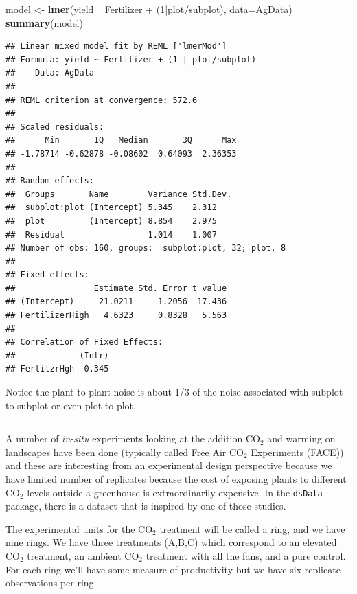 \documentclass[]{book}
\newenvironment{Shaded}{\begin{snugshade}}{\end{snugshade}}
\newcommand{\KeywordTok}[1]{\textcolor[rgb]{0.13,0.29,0.53}{\textbf{{#1}}}}
\newcommand{\DataTypeTok}[1]{\textcolor[rgb]{0.13,0.29,0.53}{{#1}}}
\newcommand{\DecValTok}[1]{\textcolor[rgb]{0.00,0.00,0.81}{{#1}}}
\newcommand{\StringTok}[1]{\textcolor[rgb]{0.31,0.60,0.02}{{#1}}}
\newcommand{\NormalTok}[1]{{#1}}
\theoremstyle{definition}
\theoremstyle{definition}
\theoremstyle{remark}
\begin{document}
\begin{Shaded}
\begin{Highlighting}[]
\NormalTok{model <-}\StringTok{ }\KeywordTok{lmer}\NormalTok{(yield ~}\StringTok{ }\NormalTok{Fertilizer +}\StringTok{ }\NormalTok{(}\DecValTok{1}\NormalTok{|plot/subplot), }\DataTypeTok{data=}\NormalTok{AgData)}
\KeywordTok{summary}\NormalTok{(model)}
\end{Highlighting}
\end{Shaded}

\begin{verbatim}
## Linear mixed model fit by REML ['lmerMod']
## Formula: yield ~ Fertilizer + (1 | plot/subplot)
##    Data: AgData
## 
## REML criterion at convergence: 572.6
## 
## Scaled residuals: 
##      Min       1Q   Median       3Q      Max 
## -1.78714 -0.62878 -0.08602  0.64093  2.36353 
## 
## Random effects:
##  Groups       Name        Variance Std.Dev.
##  subplot:plot (Intercept) 5.345    2.312   
##  plot         (Intercept) 8.854    2.975   
##  Residual                 1.014    1.007   
## Number of obs: 160, groups:  subplot:plot, 32; plot, 8
## 
## Fixed effects:
##                Estimate Std. Error t value
## (Intercept)     21.0211     1.2056  17.436
## FertilizerHigh   4.6323     0.8328   5.563
## 
## Correlation of Fixed Effects:
##             (Intr)
## FertilzrHgh -0.345
\end{verbatim}

Notice the plant-to-plant noise is about 1/3 of the noise associated
with subplot-to-subplot or even plot-to-plot.

\begin{center}\rule{0.5\linewidth}{\linethickness}\end{center}

A number of \emph{in-situ} experiments looking at the addition CO\(_2\)
and warming on landscapes have been done (typically called Free Air
CO\(_2\) Experiments (FACE)) and these are interesting from an
experimental design perspective because we have limited number of
replicates because the cost of exposing plants to different CO\(_2\)
levels outside a greenhouse is extraordinarily expensive. In the
\texttt{dsData} package, there is a dataset that is inspired by one of
those studies.

The experimental units for the CO\(_2\) treatment will be called a ring,
and we have nine rings. We have three treatments (A,B,C) which
correspond to an elevated CO\(_2\) treatment, an ambient CO\(_2\)
treatment with all the fans, and a pure control. For each ring we'll
have some measure of productivity but we have six replicate observations
per ring.
\end{document}
